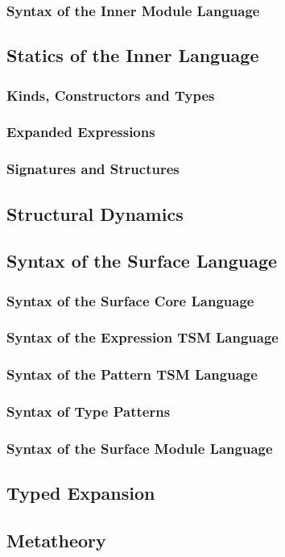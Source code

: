 \subsubsection{Syntax of the Inner Module Language}
\subsection{Statics of the Inner Language}
\subsubsection{Kinds, Constructors and Types}
\subsubsection{Expanded Expressions}
\subsubsection{Signatures and Structures}
\subsection{Structural Dynamics}
\subsection{Syntax of the Surface Language}
\subsubsection{Syntax of the Surface Core Language}
\subsubsection{Syntax of the Expression TSM Language}
\subsubsection{Syntax of the Pattern TSM Language}
\subsubsection{Syntax of Type Patterns}
\subsubsection{Syntax of the Surface Module Language}

\subsection{Typed Expansion}
\subsection{Metatheory}
